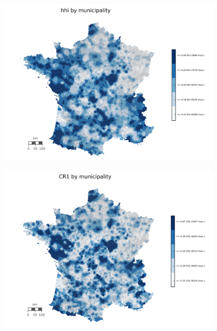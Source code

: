 \documentclass[11pt]{article}
\begin{document}
\begin{figure}[H]
	\centering
		\includegraphics[width=14cm]{images/maps_competition/fra_com_hhi.png}
\end{figure}

\begin{figure}[H]
	\centering
		\includegraphics[width=14cm]{images/maps_competition/fra_com_CR1.png}
\end{figure}
\end{document}
